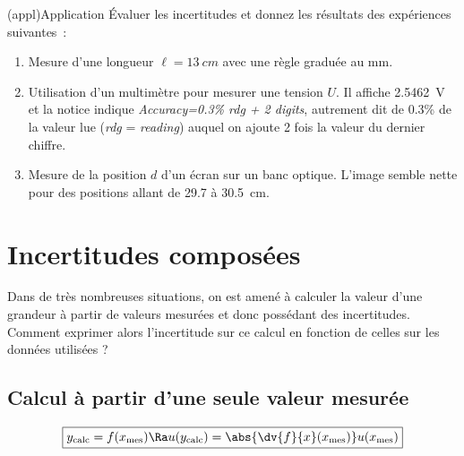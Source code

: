 \documentclass[../main/main.tex]{subfiles}
\begin{document}
\begin{tcb}(appl){Application}
  Évaluer les incertitudes et donnez les résultats des expériences suivantes~:
  \begin{enumerate}
    \item Mesure d'une longueur $\ell = \SI{13}{cm}$ avec une règle graduée au
      \si{mm}.
      \smallbreak
     \vspace*{-20pt}
    \item Utilisation d'un multimètre pour mesurer une tension $U$. Il affiche
      \SI{2.5462}{V} et la notice indique \textit{Accuracy=0.3\% rdg + 2
      digits}, autrement dit de \num{0.3}\% de la valeur lue (\textit{rdg} =
      \textit{reading}) auquel on ajoute 2 fois la valeur du dernier chiffre.
      \smallbreak
     \vspace*{-20pt}
     \item Mesure de la position $d$ d'un écran sur un banc optique. L'image
       semble nette pour des positions allant de \num{29.7} à \SI{30.5}{cm}.
       \smallbreak
     \vspace*{-20pt}
  \end{enumerate}
\end{tcb}

\section{Incertitudes composées}
Dans de très nombreuses situations, on est amené à calculer la valeur d'une
grandeur à partir de valeurs mesurées et donc possédant des incertitudes.
Comment exprimer alors l'incertitude sur ce calcul en fonction de celles sur les
données utilisées ?

\subsection{Calcul à partir d'une seule valeur mesurée}
\[
  \boxed{y_{\rm calc} = f(x_{\rm mes}) \Ra u(y_{\rm calc}) =
  \abs{\dv{f}{x}(x_{\rm mes})}u(x_{\rm mes})}
\]
\end{document}

